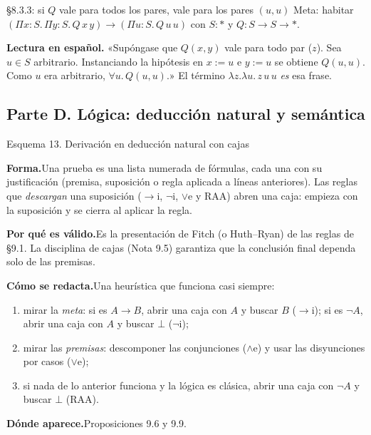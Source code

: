 \documentclass[11pt,a4paper]{article}
\newcommand{\forma}{\par\noindent\textbf{Forma.}\enspace}
\newcommand{\porque}{\par\smallskip\noindent\textbf{Por qué es válido.}\enspace}
\newcommand{\plantilla}{\par\smallskip\noindent\textbf{Cómo se redacta.}\enspace}
\newcommand{\donde}{\par\smallskip\noindent\textbf{Dónde aparece.}\enspace}
\begin{document}
\begin{ejemplotesis}{§8.3.3: si \(Q\) vale para todos los pares, vale para los pares \((u,u)\)}
Meta: habitar \((\Pi x{:}S.\,\Pi y{:}S.\,Q\,x\,y)\to(\Pi u{:}S.\,Q\,u\,u)\) con
\(S:*\) y \(Q:S\to S\to *\).
\begin{center}
\begin{flagderiv}[fdpi]
\end{flagderiv}
\end{center}
\textbf{Lectura en español.} «Supóngase que \(Q(x,y)\) vale para todo par
(\(z\)). Sea \(u\in S\) arbitrario. Instanciando la hipótesis en \(x:=u\) e
\(y:=u\) se obtiene \(Q(u,u)\). Como \(u\) era arbitrario, \(\forall u.\,Q(u,u)\).»
El término \(\lambda z.\lambda u.\,z\,u\,u\) \emph{es} esa frase.
\end{ejemplotesis}

\subsection*{Parte D. Lógica: deducción natural y semántica}

\begin{esquema}{Esquema 13. Derivación en deducción natural con cajas}
\forma Una prueba es una lista numerada de fórmulas, cada una con su
justificación (premisa, suposición o regla aplicada a líneas anteriores). Las
reglas que \emph{descargan} una suposición (\(\to\)i, \(\neg\)i, \(\vee\)e y
RAA) abren una caja: empieza con la suposición y se cierra al aplicar la regla.

\porque Es la presentación de Fitch (o Huth--Ryan) de las reglas de §9.1. La
disciplina de cajas (Nota 9.5) garantiza que la conclusión final dependa solo
de las premisas.

\plantilla Una heurística que funciona casi siempre:
\begin{enumerate}
  \item mirar la \emph{meta}: si es \(A\to B\), abrir una caja con \(A\) y
    buscar \(B\) (\(\to\)i); si es \(\neg A\), abrir una caja con \(A\) y
    buscar \(\bot\) (\(\neg\)i);
  \item mirar las \emph{premisas}: descomponer las conjunciones (\(\wedge\)e) y
    usar las disyunciones por casos (\(\vee\)e);
  \item si nada de lo anterior funciona y la lógica es clásica, abrir una caja
    con \(\neg A\) y buscar \(\bot\) (RAA).
\end{enumerate}

\donde Proposiciones 9.6 y 9.9.
\end{esquema}
\end{document}
